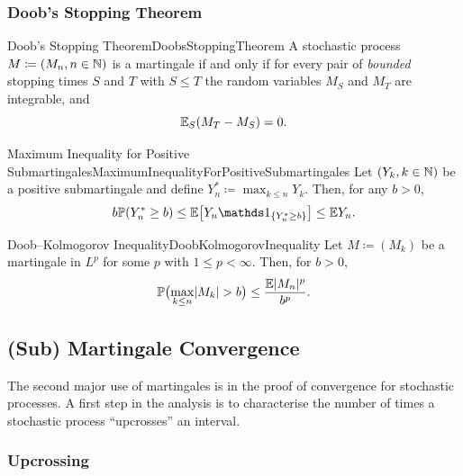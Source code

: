 \subsubsection{Doob's Stopping Theorem}
\begin{thm}{Doob's Stopping Theorem}{DoobsStoppingTheorem}
	A stochastic process \(M \coloneqq (M_n, n \in \mathbb{N})\) is a martingale if and only if for every pair of \emph{bounded} stopping times \(S\) and \(T\) with \(S \le T\) the random variables \(M_S\) and \(M_T\) are integrable, and
	\begin{equation}\label{eq:DoobsStoppingEquality}
		\mathbb{E}_S(M_T - M_S) = 0.
	\end{equation}
\end{thm}

\begin{lem}{Maximum Inequality for Positive Submartingales}{MaximumInequalityForPositiveSubmartingales}
	Let \((Y_k, k \in \mathbb{N})\) be a positive submartingale and define \(Y_n^* \coloneqq \max_{k \le n} Y_k\). Then, for any \(b > 0\),
	\begin{equation}\label{eq:MaxInequalityPositiveSub}
		b \Pm(Y_n^* \ge b) \le \E\bigl[Y_n \I_{\{Y_n^* \ge b\}}\bigr] \le \E Y_n.
	\end{equation}
\end{lem}

\begin{thm}{Doob--Kolmogorov Inequality}{DoobKolmogorovInequality}%
	Let \(M \coloneqq (M_k)\) be a martingale in \(L^p\) for some \(p\) with \(1 \le p < \infty\). Then, for \(b > 0\),
	\begin{equation}\label{eq:DoobKolmogorovInequality}
		\mathbb{P}\bigl(\max_{k \le n} \lvert M_k \rvert > b\bigr) \le \frac{\mathbb{E} \lvert M_n \rvert^p}{b^p}.
	\end{equation}
\end{thm}

\subsection{(Sub) Martingale Convergence}
The second major use of martingales is in the proof of convergence for stochastic processes. A first step in the analysis is to characterise the number of times a stochastic process ``upcrosses'' an interval.

\subsubsection{Upcrossing}

